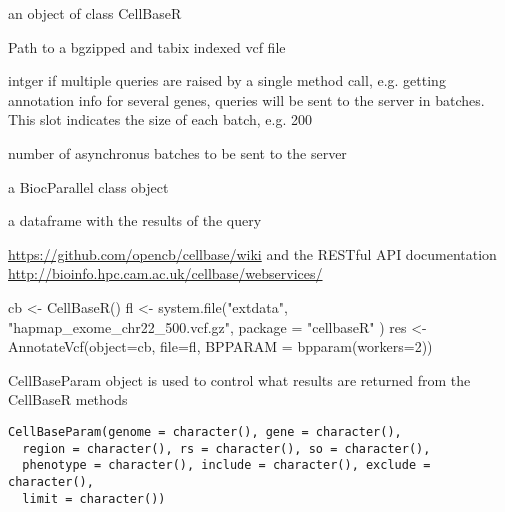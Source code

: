 \documentclass[letterpaper]{book}
\begin{document}
%
\begin{Arguments}
\begin{ldescription}
\item[\code{object}] an object of class CellBaseR

\item[\code{file}] Path to a bgzipped and tabix indexed vcf file

\item[\code{batch\_size}] intger if multiple queries are raised by a single method 
call, e.g. getting annotation info for several genes,
queries will be sent to the server in batches. This slot indicates the size 
of each batch, e.g. 200

\item[\code{num\_threads}] number of asynchronus batches to be sent to the server

\item[\code{BPPARAM}] a BiocParallel class object
\end{ldescription}
\end{Arguments}
%
\begin{Value}
a dataframe with the results of the query
\end{Value}
%
\begin{SeeAlso}\relax
\url{https://github.com/opencb/cellbase/wiki} 
and the RESTful API documentation 
\url{http://bioinfo.hpc.cam.ac.uk/cellbase/webservices/}
\end{SeeAlso}
%
\begin{Examples}
\begin{ExampleCode}
cb <- CellBaseR()
fl <- system.file("extdata", "hapmap_exome_chr22_500.vcf.gz",
                  package = "cellbaseR" )
res <- AnnotateVcf(object=cb, file=fl, BPPARAM = bpparam(workers=2))
\end{ExampleCode}
\end{Examples}
%
\begin{Description}\relax
CellBaseParam object is used to control what results are returned from the
CellBaseR methods
\end{Description}
%
\begin{Usage}
\begin{verbatim}
CellBaseParam(genome = character(), gene = character(),
  region = character(), rs = character(), so = character(),
  phenotype = character(), include = character(), exclude = character(),
  limit = character())
\end{verbatim}
\end{Usage}
\end{document}
